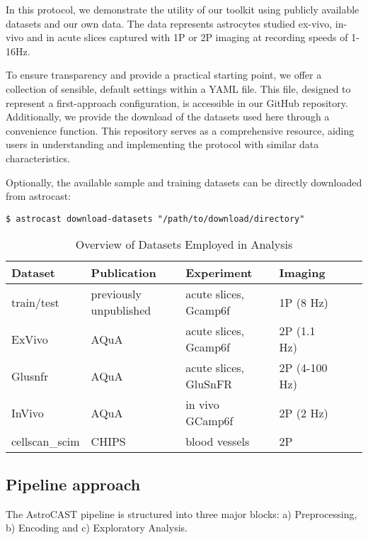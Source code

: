 In this protocol, we demonstrate the utility of our toolkit using publicly available datasets and our own data.
The data represents astrocytes studied ex-vivo, in-vivo and in acute slices captured with \ac{1P} or \ac{2P} imaging at recording speeds of 1-16Hz.

To ensure transparency and provide a practical starting point, we offer a collection of sensible, default settings
within a YAML file.
This file, designed to represent a first-approach configuration, is accessible in our GitHub repository.
Additionally, we provide the download of the datasets used here through a convenience function.
This repository serves as a comprehensive resource, aiding users in understanding and implementing the protocol with
similar data characteristics.


Optionally, the available sample and training datasets can be directly downloaded from astrocast:
\begin{lstlisting}[style=bashStyle]
    $ astrocast download-datasets "/path/to/download/directory"
\end{lstlisting}


\begin{table}[ht]
    \centering
    \caption{Overview of Datasets Employed in Analysis}
    \begin{tabular}{|l|l|l|l|l|l|}
        \hline
        \textbf{Dataset} & \textbf{Publication} & \textbf{Experiment} & \textbf{Imaging} \\ \hline
        train/test & previously unpublished & acute slices, Gcamp6f & \ac{1P} (8 Hz) \\ \hline
        ExVivo & AQuA\citep{wang_event-based_2018} & acute slices, Gcamp6f & \ac{2P} (1.1 Hz) \\ \hline
        Glusnfr & AQuA\citep{wang_event-based_2018} & acute slices, GluSnFR & \ac{2P} (4-100 Hz) \\ \hline
        InVivo & AQuA\citep{wang_event-based_2018} & in vivo GCamp6f & \ac{2P} (2 Hz) \\ \hline
        cellscan\_scim & CHIPS\citep{barrett_chips_2018} & blood vessels & \ac{2P} \\ \hline
    \end{tabular}
\end{table}

\subsection{Pipeline approach}
The AstroCAST pipeline is structured into three major blocks: a) Preprocessing, b) Encoding and c) Exploratory Analysis.

